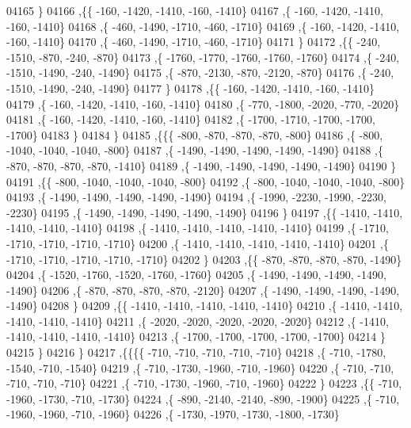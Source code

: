 \begin{DoxyCode}
04165     \}
04166    ,\{\{  -160, -1420, -1410,  -160, -1410\}
04167     ,\{  -160, -1420, -1410,  -160, -1410\}
04168     ,\{  -460, -1490, -1710,  -460, -1710\}
04169     ,\{  -160, -1420, -1410,  -160, -1410\}
04170     ,\{  -460, -1490, -1710,  -460, -1710\}
04171     \}
04172    ,\{\{  -240, -1510,  -870,  -240,  -870\}
04173     ,\{ -1760, -1770, -1760, -1760, -1760\}
04174     ,\{  -240, -1510, -1490,  -240, -1490\}
04175     ,\{  -870, -2130,  -870, -2120,  -870\}
04176     ,\{  -240, -1510, -1490,  -240, -1490\}
04177     \}
04178    ,\{\{  -160, -1420, -1410,  -160, -1410\}
04179     ,\{  -160, -1420, -1410,  -160, -1410\}
04180     ,\{  -770, -1800, -2020,  -770, -2020\}
04181     ,\{  -160, -1420, -1410,  -160, -1410\}
04182     ,\{ -1700, -1710, -1700, -1700, -1700\}
04183     \}
04184    \}
04185   ,\{\{\{  -800,  -870,  -870,  -870,  -800\}
04186     ,\{  -800, -1040, -1040, -1040,  -800\}
04187     ,\{ -1490, -1490, -1490, -1490, -1490\}
04188     ,\{  -870,  -870,  -870,  -870, -1410\}
04189     ,\{ -1490, -1490, -1490, -1490, -1490\}
04190     \}
04191    ,\{\{  -800, -1040, -1040, -1040,  -800\}
04192     ,\{  -800, -1040, -1040, -1040,  -800\}
04193     ,\{ -1490, -1490, -1490, -1490, -1490\}
04194     ,\{ -1990, -2230, -1990, -2230, -2230\}
04195     ,\{ -1490, -1490, -1490, -1490, -1490\}
04196     \}
04197    ,\{\{ -1410, -1410, -1410, -1410, -1410\}
04198     ,\{ -1410, -1410, -1410, -1410, -1410\}
04199     ,\{ -1710, -1710, -1710, -1710, -1710\}
04200     ,\{ -1410, -1410, -1410, -1410, -1410\}
04201     ,\{ -1710, -1710, -1710, -1710, -1710\}
04202     \}
04203    ,\{\{  -870,  -870,  -870,  -870, -1490\}
04204     ,\{ -1520, -1760, -1520, -1760, -1760\}
04205     ,\{ -1490, -1490, -1490, -1490, -1490\}
04206     ,\{  -870,  -870,  -870,  -870, -2120\}
04207     ,\{ -1490, -1490, -1490, -1490, -1490\}
04208     \}
04209    ,\{\{ -1410, -1410, -1410, -1410, -1410\}
04210     ,\{ -1410, -1410, -1410, -1410, -1410\}
04211     ,\{ -2020, -2020, -2020, -2020, -2020\}
04212     ,\{ -1410, -1410, -1410, -1410, -1410\}
04213     ,\{ -1700, -1700, -1700, -1700, -1700\}
04214     \}
04215    \}
04216   \}
04217  ,\{\{\{\{  -710,  -710,  -710,  -710,  -710\}
04218     ,\{  -710, -1780, -1540,  -710, -1540\}
04219     ,\{  -710, -1730, -1960,  -710, -1960\}
04220     ,\{  -710,  -710,  -710,  -710,  -710\}
04221     ,\{  -710, -1730, -1960,  -710, -1960\}
04222     \}
04223    ,\{\{  -710, -1960, -1730,  -710, -1730\}
04224     ,\{  -890, -2140, -2140,  -890, -1900\}
04225     ,\{  -710, -1960, -1960,  -710, -1960\}
04226     ,\{ -1730, -1970, -1730, -1800, -1730\}

\end{DoxyCode}
